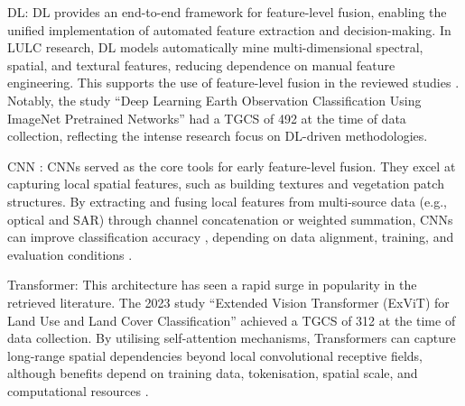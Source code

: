 \documentclass[]{interact}
\theoremstyle{plain}%
\theoremstyle{definition}
\theoremstyle{remark}
\DeclareRobustCommand{\DIFadd}[1]{{\protect\color{DIFaddcolor}\uwave{#1}}}
\DeclareRobustCommand{\DIFdel}[1]{{\protect\color{DIFdelcolor}\sout{#1}}}
\def\DIFadd#1{#1}%
\def\DIFdel#1{}%
\begin{document}
DL\DIFdel{)}: \DIFdel{As} \DIFdel{the} \DIFdel{foundation} \DIFdel{of} \DIFdel{the} \DIFdel{modern} \DIFdel{technical} \DIFdel{ecosystem}\DIFdel{,} DL provides an end-to-end framework for feature-level fusion, enabling the unified implementation of automated feature extraction and decision-making. In LULC research, DL models automatically mine multi-dimensional spectral, spatial, and textural features, \DIFdel{overcoming} \DIFdel{the} \DIFdel{bottlenecks} \DIFdel{of} \DIFadd{reducing} \DIFadd{dependence} \DIFadd{on} manual feature engineering. This \DIFdel{has} \DIFdel{established} \DIFadd{supports} \DIFadd{the} \DIFadd{use} \DIFadd{of} feature-level fusion \DIFdel{as} \DIFdel{a} \DIFdel{mainstream} \DIFdel{strategy} \DIFadd{in} \DIFadd{the} \DIFadd{reviewed} \DIFadd{studies} \citep{42, 43}. Notably, the study ``Deep Learning Earth Observation Classification Using ImageNet Pretrained Networks'' \citep{28} \DIFdel{has} \DIFdel{reached}\hspace{0.33em}\DIFadd{had} a TGCS of 492 \DIFadd{at} \DIFadd{the} \DIFadd{time} \DIFadd{of} \DIFadd{data} \DIFadd{collection}, reflecting the intense research focus on DL-driven methodologies.

\medskip %
CNN \DIFdel{(}\DIFdel{Convolutional} \DIFdel{Neural} \DIFdel{Network}\DIFdel{)}: \DIFdel{CNN} \DIFadd{CNNs} served as the core tools for early feature-level fusion. They excel at capturing local spatial features, such as building textures and vegetation patch structures. By extracting and fusing local features from multi-source data (e.g., optical and SAR) through channel concatenation or weighted summation, \DIFdel{CNN} \DIFdel{significantly} \DIFdel{enhance} \DIFadd{CNNs} \DIFadd{can} \DIFadd{improve} classification accuracy \DIFdel{in} \DIFdel{complex} \DIFdel{heterogeneous} \DIFdel{surfaces}\DIFadd{,} \DIFadd{depending} \DIFadd{on} \DIFadd{data} \DIFadd{alignment}\DIFadd{,} \DIFadd{training}\DIFadd{,} \DIFadd{and} \DIFadd{evaluation} \DIFadd{conditions} \citep{41}.

\medskip
Transformer: This architecture has seen a rapid surge in popularity \DIFadd{in} \DIFadd{the} \DIFadd{retrieved} \DIFadd{literature}. \DIFdel{In} \DIFadd{The} 2023\DIFdel{,} \DIFdel{the} study ``Extended Vision Transformer (ExViT) for Land Use and Land Cover Classification'' \citep{36} achieved a TGCS of 312 \DIFadd{at} \DIFadd{the} \DIFadd{time} \DIFadd{of} \DIFadd{data} \DIFadd{collection}. By \DIFdel{utilizing} \DIFadd{utilising} self-attention mechanisms, \DIFdel{Transformer} \DIFdel{transcend} \DIFdel{the} \DIFdel{local} \DIFdel{receptive} \DIFdel{field} \DIFdel{limitations} \DIFdel{of} \DIFdel{CNN}\DIFdel{,} \DIFdel{capturing} \DIFadd{Transformers} \DIFadd{can} \DIFadd{capture} long-range spatial dependencies \DIFdel{such} \DIFdel{as} \DIFdel{large-scale} \DIFdel{urban} \DIFdel{expansion} \DIFdel{patterns} \DIFadd{beyond} \DIFadd{local} \DIFadd{convolutional} \DIFadd{receptive} \DIFadd{fields}\DIFadd{,} \DIFadd{although} \DIFadd{benefits} \DIFadd{depend} \DIFadd{on} \DIFadd{training} \DIFadd{data}\DIFadd{,} \DIFadd{tokenisation}\DIFadd{,} \DIFadd{spatial} \DIFadd{scale}\DIFadd{,} and \DIFdel{watershed-scale} \DIFdel{connectivity} \DIFadd{computational} \DIFadd{resources} \citep{45}.
\end{document}

